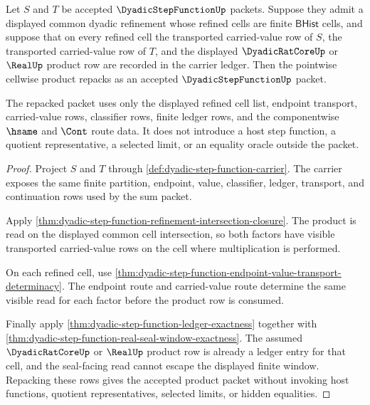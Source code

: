 \begin{theorem}
\label{thm:dyadic-step-function-product-closure}
Let $S$ and $T$ be accepted $\DyadicStepFunctionUp$ packets. Suppose they admit a displayed common dyadic refinement whose refined cells are finite $\mathsf{BHist}$ cells, and suppose that on every refined cell the transported carried-value row of $S$, the transported carried-value row of $T$, and the displayed $\DyadicRatCoreUp$ or $\RealUp$ product row are recorded in the carrier ledger. Then the pointwise cellwise product repacks as an accepted $\DyadicStepFunctionUp$ packet.

The repacked packet uses only the displayed refined cell list, endpoint transport, carried-value rows, classifier rows, finite ledger rows, and the componentwise $\hsame$ and $\Cont$ route data. It does not introduce a host step function, a quotient representative, a selected limit, or an equality oracle outside the packet.
\end{theorem}
\begin{proof}
Project $S$ and $T$ through \autoref{def:dyadic-step-function-carrier}. The carrier exposes the same finite partition, endpoint, value, classifier, ledger, transport, and continuation rows used by the sum packet.

Apply \autoref{thm:dyadic-step-function-refinement-intersection-closure}. The product is read on the displayed common cell intersection, so both factors have visible transported carried-value rows on the cell where multiplication is performed.

On each refined cell, use \autoref{thm:dyadic-step-function-endpoint-value-transport-determinacy}. The endpoint route and carried-value route determine the same visible read for each factor before the product row is consumed.

Finally apply \autoref{thm:dyadic-step-function-ledger-exactness} together with \autoref{thm:dyadic-step-function-real-seal-window-exactness}. The assumed $\DyadicRatCoreUp$ or $\RealUp$ product row is already a ledger entry for that cell, and the seal-facing read cannot escape the displayed finite window. Repacking these rows gives the accepted product packet without invoking host functions, quotient representatives, selected limits, or hidden equalities.
\end{proof}


